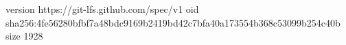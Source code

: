 version https://git-lfs.github.com/spec/v1
oid sha256:4fe56280bfbf7a48bdc9169b2419bd42c7bfa40a173554b368c53099b254c40b
size 1928
